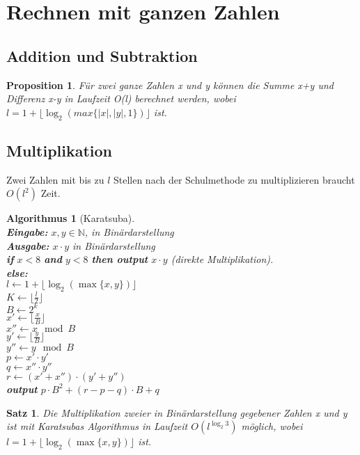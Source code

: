 \documentclass[12pt,a4paper]{article}
\theoremstyle{plain}
\newtheorem{Satz}[Theorem]{Satz}
\newtheorem{Prop}[Theorem]{Proposition}
\newtheorem{Algorithmus}[Theorem]{Algorithmus}
\newcommand{\N}{\mathbb{N}}
\numberwithin{equation}{section}
\begin{document}
\section{Rechnen mit ganzen Zahlen}
\subsection{Addition und Subtraktion}
\begin{Prop}
Für zwei ganze Zahlen x und y können die Summe x+y und Differenz x-y in Laufzeit O(l) berechnet werden, wobei $l=1+\lfloor \log_2(max\{|x|,|y|,1\})\rfloor$ ist.
\end{Prop}
\subsection{Multiplikation}
Zwei Zahlen mit bis zu $l$ Stellen nach der Schulmethode zu multiplizieren braucht $O(l^2)$ Zeit.
\begin{Algorithmus}[Karatsuba]\\
\textbf{Eingabe:} $x,y \in \N$, in Binärdarstellung\\
\textbf{Ausgabe:} $x\cdot y$ in Binärdarstellung\\
\textbf{if} $x<8$ \textbf{and} $y<8$ \textbf{then output} $x\cdot y$ (direkte Multiplikation).\\
\textbf{else:}\\
\text{\qquad}$l \leftarrow 1+ \lfloor \log_2 (\max\{x,y\})\rfloor$\\
\text{\qquad}$K \leftarrow \lfloor \frac{l}{2} \rfloor$ \\
\text{\qquad}$B \leftarrow 2^k$\\
\text{\qquad}$x' \leftarrow \lfloor\frac{x}{B} \rfloor$\\
\text{\qquad}$x'' \leftarrow x\mod B$\\
\text{\qquad}$y' \leftarrow \lfloor\frac{y}{B} \rfloor$\\
\text{\qquad}$y'' \leftarrow y\mod B$\\
\text{\qquad}$p \leftarrow x'\cdot y'$\\
\text{\qquad}$q \leftarrow x''\cdot y''$\\
\text{\qquad}$ r\leftarrow (x'+x'')\cdot (y'+y'')$\\
\text{\qquad}\textbf{output} $p\cdot B^2+(r-p-q)\cdot B+q$
\end{Algorithmus}
\begin{Satz}
Die Multiplikation zweier in Binärdarstellung gegebener Zahlen x und y ist mit \mbox{Karatsubas} Algorithmus in Laufzeit $O(l^{\log_2 3})$ möglich, wobei $l=1+\lfloor\log_2(\max\{x,y\})\rfloor$ ist.
\end{Satz}
\end{document}
